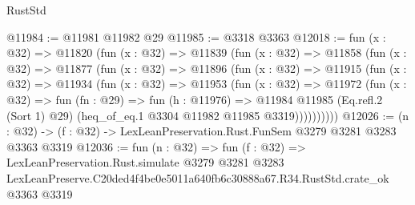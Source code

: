 \begin{lexlean}{RustStd}
\begin{coremodule}
@11984 := @11981 @11982 @29
@11985 := @3318 @3363
@12018 := fun (x : @32) =>
  @11820
    (fun (x : @32) =>
    @11839
      (fun (x : @32) =>
      @11858
        (fun (x : @32) =>
        @11877
          (fun (x : @32) =>
          @11896
            (fun (x : @32) =>
            @11915
              (fun (x : @32) =>
              @11934
                (fun (x : @32) =>
                @11953
                  (fun (x : @32) =>
                  @11972
                    (fun (x : @32) =>
                    fun (fn : @29) =>
                    fun (h : @11976) =>
                    @11984
                      @11985
                      (Eq.refl.{2} (Sort 1) @29)
                      (heq_of_eq.{1} @3304 @11982 @11985 @3319))))))))))
@12026 := (n : @32) -> (f : @32) -> LexLeanPreservation.Rust.FunSem @3279 @3281 @3283 @3363 @3319
@12036 := fun (n : @32) =>
  fun (f : @32) =>
  LexLeanPreservation.Rust.simulate
    @3279
    @3281
    @3283
    LexLeanPreserve.C20ded4f4be0e5011a640fb6c30888a67.R34.RustStd.crate_ok
    @3363
    @3319
\end{coremodule}
\end{lexlean}
